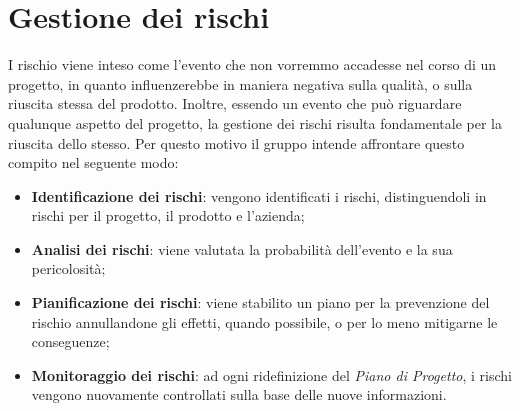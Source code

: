 \section{Gestione dei rischi}
I rischio viene inteso come l'evento che non vorremmo accadesse nel corso di un progetto, in quanto influenzerebbe in maniera negativa sulla qualità, o sulla riuscita stessa del prodotto. Inoltre, essendo un evento che può riguardare qualunque aspetto del progetto, la gestione dei rischi risulta fondamentale per la riuscita dello stesso. Per questo motivo il gruppo intende affrontare questo compito nel seguente modo:\\
\begin{itemize}
\item \textbf{Identificazione dei rischi}: vengono identificati i rischi, distinguendoli in rischi per il progetto, il prodotto e l'azienda;
\item \textbf{Analisi dei rischi}: viene valutata la probabilità dell'evento e la sua pericolosità;
\item \textbf{Pianificazione dei rischi}: viene stabilito un piano per la prevenzione del rischio annullandone gli effetti, quando possibile, o per lo meno mitigarne le conseguenze;
\item \textbf{Monitoraggio dei rischi}: ad ogni ridefinizione del \textit{Piano di Progetto}, i rischi vengono nuovamente controllati sulla base delle nuove informazioni.
\end{itemize}


